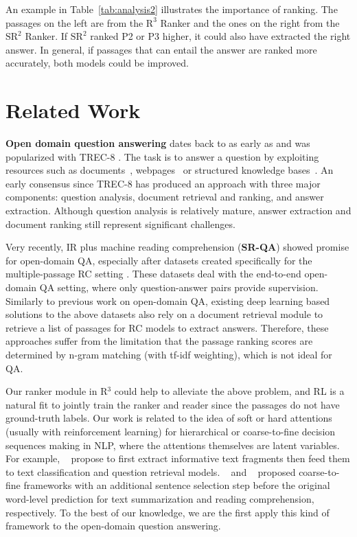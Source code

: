 \documentclass[letterpaper]{article} \usepackage{aaai18}  \usepackage{times}  \usepackage{helvet}  \usepackage{courier}  \usepackage{url}  \usepackage{graphicx}  \usepackage{comment}
\begin{document}
An example in Table~\ref{tab:analysis2} illustrates the importance of ranking.  The passages on the left are from the $\text{R}^3$ Ranker and the ones on the right from the $\text{SR}^2$ Ranker. If $\text{SR}^2$ ranked P2 or P3 higher, it could also have extracted the right answer. In general, if passages that can entail the answer are ranked more accurately, both models could be improved. 


\section{Related Work}

\textbf{Open domain question answering} dates back to as early as \cite{green1961baseball} and was popularized with TREC-8 \cite{voorhees1999trec}. The task is to answer a question by exploiting resources such as
documents~\cite{voorhees1999trec}, webpages~\cite{kwok2001scaling,chen2017discriminative} 
or structured knowledge bases~\cite{berant2013semantic,bordes2015large,yu2017improved}.
An early consensus since TREC-8 has produced an approach with three major components: question analysis, document retrieval and ranking, and answer extraction. Although question analysis is relatively mature, answer extraction and document ranking still represent significant challenges.

Very recently, IR plus machine reading comprehension (\textbf{SR-QA}) showed promise for open-domain QA, especially after datasets created specifically for the multiple-passage RC setting \cite{nguyen2016ms,chen2017reading,JoshiTriviaQA2017,dunn2017searchqa,dhingra2017quasar}.
These datasets deal with the end-to-end open-domain QA setting, where  only question-answer pairs provide supervision.
Similarly to previous work on open-domain QA, existing deep learning based solutions to the above datasets also rely on a document retrieval module to retrieve a list of passages for RC models to extract answers.
Therefore, these approaches suffer from the limitation that the passage ranking scores are determined by n-gram matching (with tf-idf weighting), which is not ideal for QA.

Our ranker module in R$^3$
could help to alleviate the above problem, and
RL is a natural fit to jointly train the ranker and reader since the passages do not have ground-truth labels.
Our work is related to the idea of soft or hard attentions (usually with reinforcement learning) for hierarchical or coarse-to-fine decision sequences making in NLP, where the attentions themselves are latent variables. For example, \citeauthor{lei2016rationalizing}~\citeyear{lei2016rationalizing} propose to first extract informative text fragments then feed them to text classification and question retrieval models.
\citeauthor{cheng2016neural}~\citeyear{cheng2016neural} and \citeauthor{choi2017coarse}~\citeyear{choi2017coarse} proposed coarse-to-fine frameworks with an additional sentence selection step before the original word-level prediction for text summarization and reading comprehension, respectively.
To the best of our knowledge, we are the first apply this kind of framework to the open-domain question answering.
\end{document}
